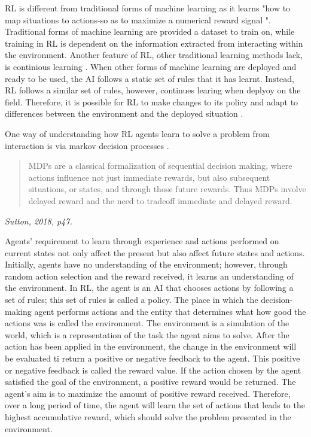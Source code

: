 RL is different from traditional forms of machine learning as it learns "how to map situations to actions-so as to maximize a numerical reward signal \cite{Sutton1}". Traditional forms of machine learning are provided a dataset to train on, while training in RL is dependent on the information extracted from interacting within the environment. Another feature of RL, other traditional learning methods lack, is continious learning \cite{sreenivas2022safe}. When other forms of machine learning are deployed and ready to be used, the AI follows a static set of rules that it has learnt. Instead, RL follows a similar set of rules, however, continues learing when deplyoy on the field. Therefore, it is possible for RL to make changes to its policy and adapt to differences between the environment and the deployed situation \cite{sreenivas2022safe}.

One way of understanding how RL agents learn to solve a problem from interaction is via markov decision processes \cite{Sutton1}.

\begin{quote}
MDPs are a classical formalization of sequential decision making,
where actions influence not just immediate rewards, but also subsequent situations, or
states, and through those future rewards. Thus MDPs involve delayed reward and the
need to tradeoff immediate and delayed reward.
\end{quote}
\hspace*{\fill} \textit{Sutton, 2018, p47.}

Agents' requirement to learn through experience and actions performed on current states not only affect the present but also affect future states and actions. Initially, agents have no understanding of the environment; however, through random action selection and the reward received, it learns an understanding of the environment. In RL, the agent is an AI that chooses actions by following a set of rules; this set of rules is called a policy. The place in which the decision-making agent performs actions and the entity that determines what how good the actions was is called the environment. The environment is a simulation of the world, which is a representation of the task the agent aims to solve. After the action has been applied in the environment, the change in the environment will be evaluated ti return a positive or negative feedback to the agent. This positive or negative feedback is called the reward value. If the action chosen by the agent satisfied the goal of the environment, a positive reward would be returned. The agent’s aim is to maximize the amount of positive reward received. Therefore, over a long period of time, the agent will learn the set of actions that leads to the highest accumulative reward, which should solve the problem presented in the environment. 

